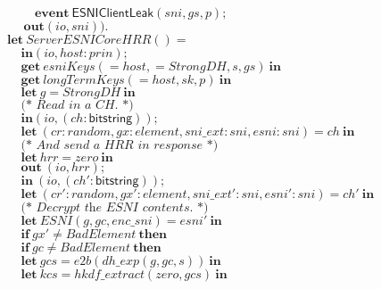 \documentclass{article}
\theoremstyle{definition}
\newcommand{\kwl}[1]{\mathbf{#1}}
\newcommand{\kwt}[1]{\mathsf{#1}}
\newcommand{\kwe}[1]{\mathsf{#1}}
\newcommand{\var}[1]{\mathit{#1}}
\theoremstyle{definition}
\begin{document}
\begin{tabbing}
$\ \ \ \ \ \ \ \ \ \ \kwl{event}\ \kwe{ESNIClientLeak}(\var{sni}, \var{gs}, \var{p}); $\\
$\ \ \ \ \ \ \kwl{out}(\var{io}, \var{sni})). $\\
$ $\\
$ $\\
$\kwl{let}\ \var{ServerESNICoreHRR}() =  $\\
$\ \ \ \ \ \kwl{in}(\var{io}, \var{host}{:}\var{prin}); $\\
$\ \ \ \ \ \kwl{get}\ \var{esniKeys}( = \var{host},  = \var{StrongDH}, \var{s}, \var{gs})\ \kwl{in} $\\
$\ \ \ \ \ \kwl{get}\ \var{longTermKeys}( = \var{host}, \var{sk}, \var{p})\ \kwl{in} $\\
$\ \ \ \ \ \kwl{let}\ \var{g} = \var{StrongDH}\ \kwl{in} $\\
$ $\\
$\ \ \ \ \ \textit{(* Read in a CH. *)} $\\
$\ \ \ \ \ \kwl{in}(\var{io}, (\var{ch}{:}\kwt{bitstring})); $\\
$\ \ \ \ \ \kwl{let}\ (\var{cr}{:}\var{random}, \var{gx}{:}\var{element}, \var{sni{\_}ext}{:}\var{sni}, \var{esni}{:}\var{sni}) = \var{ch}\ \kwl{in} $\\
$ $\\
$\ \ \ \ \ \textit{(* And send a HRR in response *)} $\\
$\ \ \ \ \ \kwl{let}\ \var{hrr} = \var{zero}\ \kwl{in} $\\
$\ \ \ \ \ \kwl{out}\ (\var{io}, \var{hrr}); $\\
$\ \ \ \ \ \kwl{in}\ (\var{io}, (\var{ch'}{:}\kwt{bitstring})); $\\
$\ \ \ \ \ \kwl{let}\ (\var{cr'}{:}\var{random}, \var{gx'}{:}\var{element}, \var{sni{\_}ext'}{:}\var{sni}, \var{esni'}{:}\var{sni}) = \var{ch'}\ \kwl{in} $\\
$ $\\
$\ \ \ \ \ \textit{(* Decrypt the ESNI contents. *)} $\\
$\ \ \ \ \ \kwl{let}\ \var{ESNI}(\var{g}, \var{gc}, \var{enc{\_}sni}) = \var{esni'}\ \kwl{in} $\\
$\ \ \ \ \ \kwl{if}\ \var{gx'}\neq\var{BadElement}\ \kwl{then} $\\
$\ \ \ \ \ \kwl{if}\ \var{gc}\neq\var{BadElement}\ \kwl{then} $\\
$\ \ \ \ \ \kwl{let}\ \var{gcs} = \var{e2b}(\var{dh{\_}exp}(\var{g}, \var{gc}, \var{s}))\ \kwl{in} $\\
$\ \ \ \ \ \kwl{let}\ \var{kcs} = \var{hkdf{\_}extract}(\var{zero}, \var{gcs})\ \kwl{in} $\\

\end{tabbing}
\end{document}
